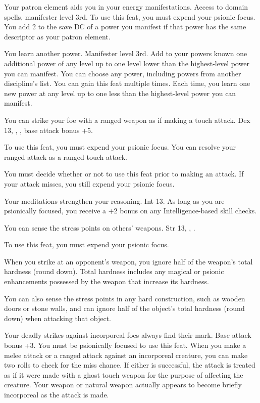 {Your patron element aids you in your energy manifestations.}
{Access to domain spells, manifester level 3rd.}
{To use this feat, you must expend your psionic focus. You add 2 to the save DC of a power you manifest if that power has the same descriptor as your patron element.}
{}{}

{You learn another power.}
{Manifester level 3rd.}
{Add to your powers known one additional power of any level up to one level lower than the highest-level power you can manifest. You can choose any power, including powers from another discipline's list.}
{}
{You can gain this feat multiple times. Each time, you learn one new power at any level up to one less than the highest-level power you can manifest.}

{You can strike your foe with a ranged weapon as if making a touch attack.}
{Dex 13, , , base attack bonus +5.}
{To use this feat, you must expend your psionic focus. You can resolve your ranged attack as a ranged touch attack.

You must decide whether or not to use this feat prior to making an attack. If your attack misses, you still expend your psionic focus.}
{}{}

{Your meditations strengthen your reasoning.}
{Int 13.}
{As long as you are psionically focused, you receive a +2 bonus on any Intelligence-based skill checks.}
{}{}

{You can sense the stress points on others' weapons.}
{Str 13, , .}
{To use this feat, you must expend your psionic focus.

When you strike at an opponent's weapon, you ignore half of the weapon's total hardness (round down). Total hardness includes any magical or psionic enhancements possessed by the weapon that increase its hardness.}
{}
{You can also sense the stress points in any hard construction, such as wooden doors or stone walls, and can ignore half of the object's total hardness (round down) when attacking that object.}

{Your deadly strikes against incorporeal foes always find their mark.}
{Base attack bonus +3.}
{You must be psionically focused to use this feat. When you make a melee attack or a ranged attack against an incorporeal creature, you can make two rolls to check for the miss chance. If either is successful, the attack is treated as if it were made with a ghost touch weapon for the purpose of affecting the creature. Your weapon or natural weapon actually appears to become briefly incorporeal as the attack is made.}
{}{}

